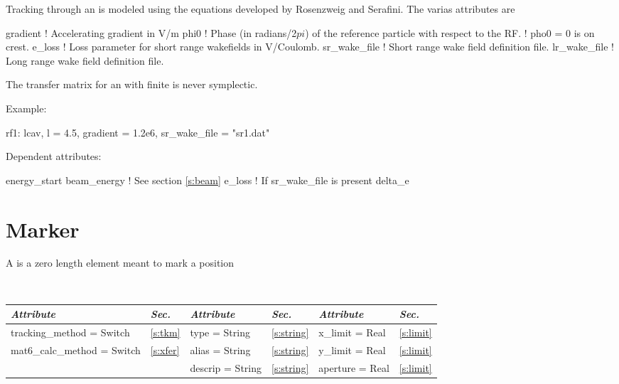 Tracking through an  is modeled using the equations developed by Rosenzweig
and Serafini\cite{b:rosenzweig}. The varias attributes are
\begin{example}
  gradient     ! Accelerating gradient in V/m
  phi0         ! Phase (in radians/2$pi$) of the reference particle with respect to the RF. 
               !  pho0 = 0 is on crest.
  e_loss       ! Loss parameter for short range wakefields in V/Coulomb.
  sr_wake_file ! Short range wake field definition file.
  lr_wake_file ! Long range wake field definition file.
\end{example}

The transfer matrix for an  with finite  is never symplectic.

\vskip0.05in \noindent
Example:
\begin{example}
  rf1: lcav, l = 4.5, gradient = 1.2e6, sr\_wake\_file = "sr1.dat"
\end{example}

\vskip0.05in \noindent
Dependent attributes:
\begin{example}
  energy\_start
  beam\_energy  ! See section \ref{s:beam}
  e\_loss       ! If sr\_wake\_file is present
  delta\_e
\end{example}

\section{Marker}
\label{s:mark}

A  is a zero length element meant to mark a position

\toffset
\begin{center}
\tt
\begin{tabular}{|l|l||l|l||l|l|} \hline
  {\sl Attribute} & {\sl Sec.}  & {\sl Attribute} & {\sl Sec.} & {\sl Attribute} & {\sl Sec.} \\ \hline
  tracking\_method = Switch    & \ref{s:tkm}  &  type = String      & \ref{s:string} & x\_limit = Real  & \ref{s:limit} \\ \hline 
  mat6\_calc\_method = Switch  & \ref{s:xfer} &  alias = String     & \ref{s:string} & y\_limit = Real  & \ref{s:limit} \\ \hline 
                               &              &  descrip = String   & \ref{s:string} & aperture = Real  & \ref{s:limit} \\ \hline 
\end{tabular}
\end{center}
\toffset

